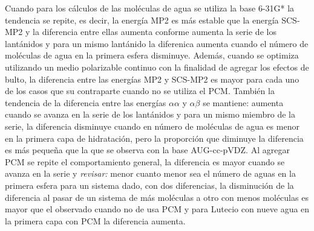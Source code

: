 Cuando para los c\'alculos de las mol\'eculas de agua se utiliza la
base 6-31G* la tendencia se repite, es decir, la energ\'ia MP2 es 
m\'as estable que la energ\'ia SCS-MP2 y la diferencia entre ellas
aumenta conforme aumenta la serie de los lant\'anidos y para un mismo
lant\'anido la diferenica aumenta cuando el n\'umero de mol\'eculas 
de agua en la primera esfera disminuye.%
 Adem\'as, cuando se optimiza utilizando un medio polarizable continuo
con la finalidad de agregar los efectos de bulto, la diferencia entre
las energ\'ias MP2 y SCS-MP2 es mayor para cada uno de los casos
que su contraparte cuando no se utiliza el PCM. Tambi\'en la 
tendencia de la diferencia entre las energ\'ias $\alpha\alpha$ y
$\alpha\beta$ se mantiene: aumenta cuando se avanza en la serie de
los lant\'anidos y para un mismo miembro de la serie, la diferencia
disminuye cuando en n\'umero de mol\'eculas de agua es menor en la
primera capa de hidrataci\'on, pero la proporci\'on que diminuye la 
diferencia es m\'as peque\~na que la que se observa con la base
AUG-cc-pVDZ. Al agregar PCM se repite el comportamiento general, la 
diferencia es mayor cuando se avanza en la serie y {\it revisar:} menor cuanto menor
sea el n\'umero de aguas en la primera esfera para un sistema dado, 
con dos diferencias, la disminuci\'on de la diferencia al pasar de un
sistema de m\'as mol\'eculas a otro con menos mol\'eculas es mayor 
que el observado cuando no de usa PCM y para Lutecio con nueve agua en
la primera capa con PCM la diferencia aumenta.

